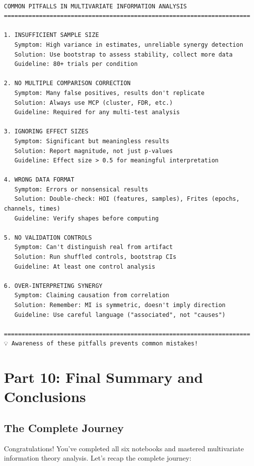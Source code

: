 \documentclass[
  11pt,
  letterpaper,
  oneside,
  openany]{book}
\begin{document}
\begin{verbatim}

COMMON PITFALLS IN MULTIVARIATE INFORMATION ANALYSIS
======================================================================

1. INSUFFICIENT SAMPLE SIZE
   Symptom: High variance in estimates, unreliable synergy detection
   Solution: Use bootstrap to assess stability, collect more data
   Guideline: 80+ trials per condition

2. NO MULTIPLE COMPARISON CORRECTION
   Symptom: Many false positives, results don't replicate
   Solution: Always use MCP (cluster, FDR, etc.)
   Guideline: Required for any multi-test analysis

3. IGNORING EFFECT SIZES
   Symptom: Significant but meaningless results
   Solution: Report magnitude, not just p-values
   Guideline: Effect size > 0.5 for meaningful interpretation

4. WRONG DATA FORMAT
   Symptom: Errors or nonsensical results
   Solution: Double-check: HOI (features, samples), Frites (epochs, channels, times)
   Guideline: Verify shapes before computing

5. NO VALIDATION CONTROLS
   Symptom: Can't distinguish real from artifact
   Solution: Run shuffled controls, bootstrap CIs
   Guideline: At least one control analysis

6. OVER-INTERPRETING SYNERGY
   Symptom: Claiming causation from correlation
   Solution: Remember: MI is symmetric, doesn't imply direction
   Guideline: Use careful language ("associated", not "causes")

======================================================================
💡 Awareness of these pitfalls prevents common mistakes!
\end{verbatim}

\section{Part 10: Final Summary and
Conclusions}\label{part-10-final-summary-and-conclusions}

\subsection{The Complete Journey}\label{the-complete-journey}

Congratulations! You've completed all six notebooks and mastered
multivariate information theory analysis. Let's recap the complete
journey:
\end{document}
